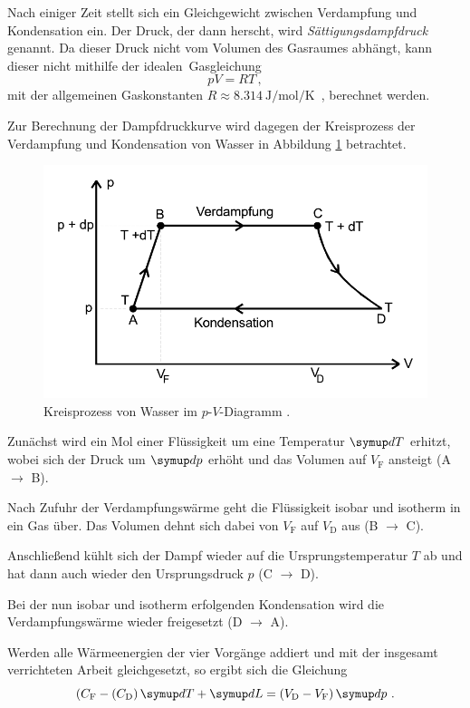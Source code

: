 Nach einiger Zeit stellt sich ein Gleichgewicht zwischen Verdampfung und Kondensation ein. 
Der Druck, der dann herscht, wird \textit{Sättigungsdampfdruck} genannt.
Da dieser Druck nicht vom Volumen des Gasraumes abhängt, kann dieser nicht mithilfe der idealen~Gasgleichung
\begin{equation}
    pV = RT  \, , \label{eq:idgasgleichung} 
\end{equation}
mit der allgemeinen Gaskonstanten $ R \approx \qty[per-mode=reciprocal]{8.314}{\joule\per\mol\per\kelvin} \,$ \cite[467]{demtroeder1}, berechnet werden.

Zur Berechnung der Dampfdruckkurve wird dagegen der Kreisprozess der Verdampfung und Kondensation von Wasser
in Abbildung \ref{fig:kreisprozess} betrachtet.
\begin{figure} 
    \centering
    \includegraphics[width=12cm] {pictures/kreisprozess.pdf}  
    \caption{Kreisprozess von Wasser im $p$-$V$-Diagramm \cite{v203}.}
    \label{fig:kreisprozess}
\end{figure}

Zunächst wird ein Mol einer Flüssigkeit um eine Temperatur $\dif{T}$ erhitzt, 
wobei sich der Druck um $\dif{p}$ erhöht und das Volumen auf $V_{\text{F}}$ ansteigt (A $\to$ B). 

Nach Zufuhr der Verdampfungswärme geht die Flüssigkeit isobar und isotherm in ein Gas über.
Das Volumen dehnt sich dabei von $V_{\text{F}}$ auf $V_{\text{D}}$ aus (B $\to$ C). 

Anschließend kühlt sich der Dampf wieder auf die Ursprungstemperatur $T$ ab 
und hat dann auch wieder den Ursprungsdruck $p$ (C $\to$ D).

Bei der nun isobar und isotherm erfolgenden Kondensation wird die Verdampfungswärme wieder freigesetzt (D $\to$ A).

Werden alle Wärmeenergien der vier Vorgänge addiert und mit der insgesamt verrichteten Arbeit gleichgesetzt,
so ergibt sich die Gleichung
\begin{equation}
    (C_\text{F} - (C_\text{D}) \dif{T} + \dif{L} = (V_\text{D} - V_\text{F}) \dif{p} \, .
\end{equation}

